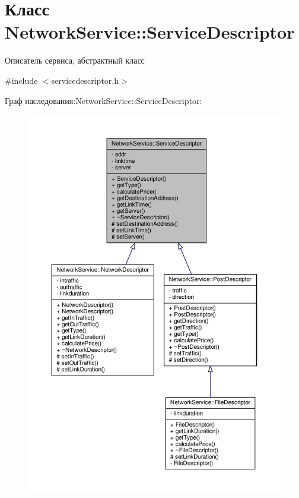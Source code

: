 \hypertarget{class_network_service_1_1_service_descriptor}{}\section{Класс Network\+Service\+:\+:Service\+Descriptor}
\label{class_network_service_1_1_service_descriptor}


Описатель сервиса, абстрактный класс  




{\ttfamily \#include $<$servicedescriptor.\+h$>$}



Граф наследования\+:Network\+Service\+:\+:Service\+Descriptor\+:\nopagebreak
\begin{figure}[H]
\begin{center}
\leavevmode
\includegraphics[width=350pt]{class_network_service_1_1_service_descriptor__inherit__graph}
\end{center}
\end{figure}


